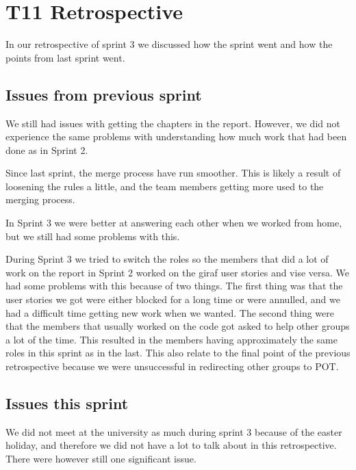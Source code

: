 \section{\gls{T11} Retrospective}

In our retrospective of sprint 3 we discussed how the sprint went and how the points from last sprint went.

\subsection{Issues from previous sprint}

We still had issues with getting the chapters in the report. However, we did not experience the same problems with understanding how much work that had been done as in Sprint 2.

Since last sprint, the merge process have run smoother. This is likely a result of loosening the rules a little, and the team members getting more used to the merging process.

In Sprint 3 we were better at answering each other when we worked from home, but we still had some problems with this.

During Sprint 3 we tried to switch the roles so the members that did a lot of work on the report in Sprint 2 worked on the \gls{giraf} user stories and vise versa. We had some problems with this because of two things. The first thing was that the user stories we got were either blocked for a long time or were annulled, and we had a difficult time getting new work when we wanted. The second thing were that the members that usually worked on the code got asked to help other groups a lot of the time. This resulted in the members having approximately the same roles in this sprint as in the last. This also relate to the final point of the previous retrospective because we were unsuccessful in redirecting other groups to \gls{POT}.

\subsection{Issues this sprint}

We did not meet at the university as much during sprint 3 because of the easter holiday, and therefore we did not have a lot to talk about in this retrospective. There were however still one significant issue.


